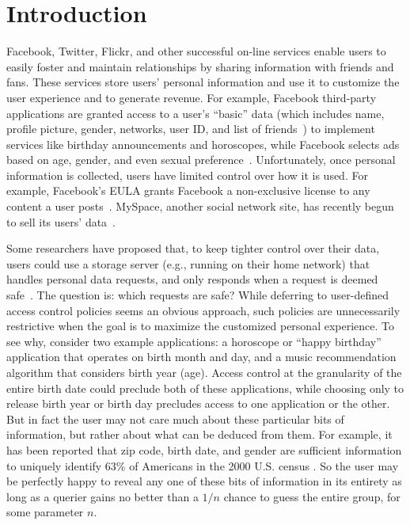 \section{Introduction}


Facebook, Twitter, Flickr, and other successful on-line services
enable users to easily foster and maintain
relationships by sharing information with friends and fans.  These
services store users' personal information and use it to customize the
user experience and to generate revenue.  For example, Facebook
third-party applications are granted access to a user's ``basic'' data
(which includes name, profile picture, gender, networks, user ID, and list
of friends~\cite{facebook-apps}) to implement services like
birthday announcements and horoscopes, while Facebook selects
ads based on age, gender, and even sexual preference~\cite{guha10}.
Unfortunately, once personal information is collected, users have
limited control over how it is used.  For example, Facebook's EULA
grants Facebook a non-exclusive license to any content a user
posts~\cite{facebook-tos}.  MySpace, another social network site, has recently
begun to sell its users' data~\cite{myspace-data}.  

Some researchers have proposed that, to
keep tighter control over their data, users could use a storage server
(e.g., running on their home network) that handles personal data requests,
and only responds when a request is deemed safe~\cite{prpl,persona}.
The question is: which requests are safe?  
While deferring to user-defined access control policies seems an
obvious approach,  
such policies are unnecessarily restrictive when the goal
is to maximize the customized personal experience.
To see why, consider two example applications: a horoscope
or ``happy birthday'' application that operates on birth month and day,
and a music recommendation algorithm that considers birth year (age).
Access control at the granularity of the entire birth date could
preclude both of these applications, while choosing only to release
birth year or birth day precludes access to one application or the other.
But in fact the user may not care much about these
particular bits of information, but rather about what can be deduced from
them.  For example, it has been reported 
that zip code, birth date, and gender are sufficient information to
uniquely identify 63\% of Americans in the 2000 U.S. census
\cite{golle06revisiting}.  So the user may be perfectly happy to
reveal any one of these bits of information in its entirety as long as
a querier gains no better than a $1 / n$ chance to guess the
entire group, for some parameter $n$.

